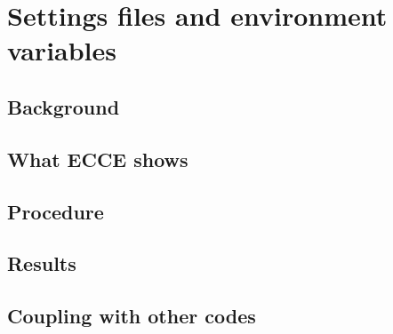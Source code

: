 \chapter{Settings files and environment variables}
\label{ch:settings}



\section{Background}

\section{What ECCE shows}

\section{Procedure}

\section{Results}

\section{Coupling with other codes}

